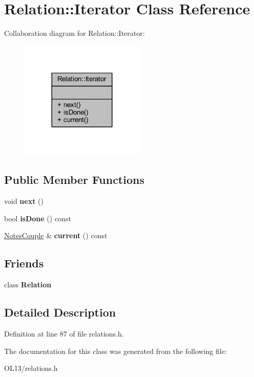 \hypertarget{class_relation_1_1_iterator}{}\section{Relation\+:\+:Iterator Class Reference}
\label{class_relation_1_1_iterator}


Collaboration diagram for Relation\+:\+:Iterator\+:
\nopagebreak
\begin{figure}[H]
\begin{center}
\leavevmode
\includegraphics[width=168pt]{class_relation_1_1_iterator__coll__graph}
\end{center}
\end{figure}
\subsection*{Public Member Functions}
\begin{DoxyCompactItemize}
\item 
\mbox{\label{class_relation_1_1_iterator_a8ff276d2d33755160725b5dbc4a95a72}} 
void {\bfseries next} ()
\item 
\mbox{\label{class_relation_1_1_iterator_ac99e741753998f6c314c3b7884d4dd44}} 
bool {\bfseries is\+Done} () const
\item 
\mbox{\label{class_relation_1_1_iterator_a4d68e76ae0fbe22f025ee747218beb26}} 
\hyperlink{class_notes_couple}{Notes\+Couple} \& {\bfseries current} () const
\end{DoxyCompactItemize}
\subsection*{Friends}
\begin{DoxyCompactItemize}
\item 
\mbox{\label{class_relation_1_1_iterator_a7ee004262f27f8c916688911a71e3aa1}} 
class {\bfseries Relation}
\end{DoxyCompactItemize}


\subsection{Detailed Description}


Definition at line 87 of file relations.\+h.



The documentation for this class was generated from the following file\+:\begin{DoxyCompactItemize}
\item 
O\+L13/relations.\+h\end{DoxyCompactItemize}
